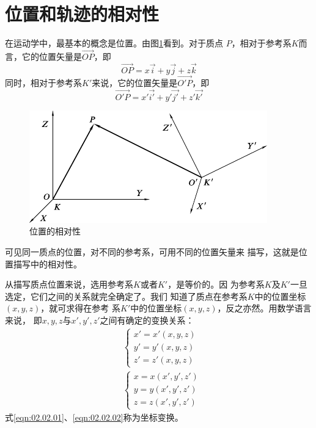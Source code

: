 \section{位置和轨迹的相对性}\label{sec:02.02}

在运动学中，最基本的概念是位置。由图\ref{fig:02.01}看到。对于质点
$P$，相对于参考系$K$而言，它的位置矢量是$\vec{OP}$，即
\begin{equation*}
  \vec{OP}=x\vec{i}+y\vec{j}+z\vec{k}
\end{equation*}
同时，相对于参考系$K'$来说，它的位置矢量是$\vec{O'P}$，即
\begin{equation*}
  \vec{O'P}=x'\vec{i'}+y'\vec{j'}+z'\vec{k'}
\end{equation*}
\begin{figure}[h]
  \vspace{-1em}
  \centering
  \includegraphics{figure/fig02.01}
  \caption{位置的相对性}
  \label{fig:02.01}
\end{figure}

\clearpage
可见同一质点的位置，对不同的参考系，可用不同的位置矢量来
描写，这就是位置描写中的相对性。

从描写质点位置来说，选用参考系$ K $或者$ K' $，是等价的。因
为参考系$K$及$K'$一旦选定，它们之间的关系就完全确定了。我们
知道了质点在参考系$K$中的位置坐标$\left(x,y,z\right)$，就可求得在参考
系$K'$中的位置坐标$\left(x,y,z\right)$，反之亦然。用数学语言来说，
即$x,y,z$与$x',y',z'$之间有确定的变换关系：
\begin{align}
  \label{eqn:02.02.01}
   & \left\{\begin{array}{l}
              x'=x'\left(x, y, z\right) \\
              y'=y'\left(x, y, z\right) \\
              z'=z'\left(x, y, z\right)
            \end{array}\right.  \\
  \label{eqn:02.02.02}
   & \left\{\begin{array}{l}
              x=x\left(x', y', z'\right) \\
              y=y\left(x', y', z'\right) \\
              z=z\left(x', y', z'\right)
            \end{array}\right.
\end{align}
式\eqref{eqn:02.02.01}、\eqref{eqn:02.02.02}称为坐标变换。

